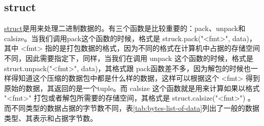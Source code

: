 \subsection{struct}
\href{https://docs.python.org/2/library/struct.html}{struct}是用来处理二进制数据的。有三个函数是比较重要的：pack、unpack和calsize。当我们调用pack这个函数的时候，格式是 struck.pack("<fmt>", data)，其中 <fmt> 指的是打包数据的格式，因为不同的格式在计算机中占据的存储空间不同，因此需要指定下，同样，当我们在调用 unpack 这个函数的时候，格式是 struct.unpack("<fmt>", data)，其格式跟 pack函数差不多，因为解包的时候也一样得知道这个压缩的数据包中都是什么样的数据，这样可以根据这个 <fmt> 得到原始的数据，其返回的是一个tuple。而 calsize 这个函数就是用来计算如果以格式 "<fmt>" 打包或者解包所需要的存储空间，其格式是 struct.calsize("<fmt>") 。而不同类型的数据占据的字节数不同，表\ref{tab:bytes-list-of-data}列出了一般的数据类型、其表示和占据字节数。
